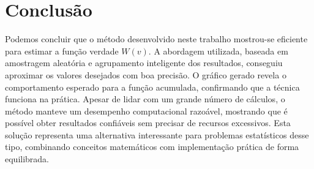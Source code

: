 \documentclass[12pt, a4paper]{article}
\begin{document}
\section{Conclusão}

Podemos concluir que o método desenvolvido neste trabalho mostrou-se eficiente para estimar a função verdade $W(v)$. A abordagem utilizada, baseada em amostragem aleatória e agrupamento inteligente dos resultados, conseguiu aproximar os valores desejados com boa precisão. O gráfico gerado revela o comportamento esperado para a função acumulada, confirmando que a técnica funciona na prática. Apesar de lidar com um grande número de cálculos, o método manteve um desempenho computacional razoável, mostrando que é possível obter resultados confiáveis sem precisar de recursos excessivos. Esta solução representa uma alternativa interessante para problemas estatísticos desse tipo, combinando conceitos matemáticos com implementação prática de forma equilibrada.
\end{document}

